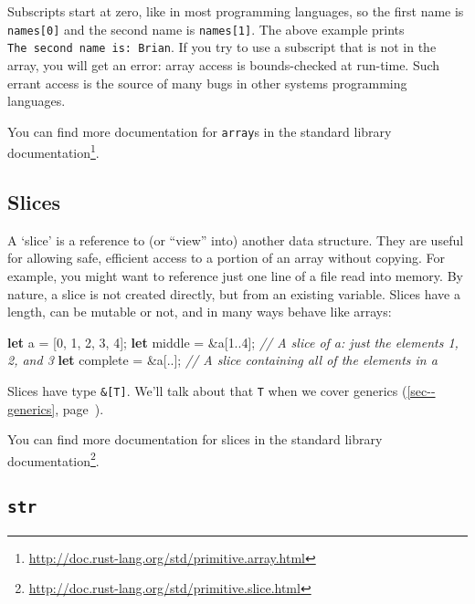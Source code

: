 \documentclass[a4paper,]{book}
\renewcommand*{\hyperref}[2][\ar]{%
  \def\ar{#2}%
  #2 (\autoref{#1}, page~\pageref{#1})}
\newenvironment{Shaded}{\begin{snugshade}}{\end{snugshade}}
\newcommand{\KeywordTok}[1]{\textcolor[rgb]{0.13,0.29,0.53}{\textbf{{#1}}}}
\newcommand{\DecValTok}[1]{\textcolor[rgb]{0.00,0.00,0.81}{{#1}}}
\newcommand{\CommentTok}[1]{\textcolor[rgb]{0.56,0.35,0.01}{\textit{{#1}}}}
\newcommand{\NormalTok}[1]{{#1}}
\renewcommand{\href}[2]{#2\footnote{\url{#1}}}
\begin{document}
Subscripts start at zero, like in most programming languages, so the
first name is \texttt{names{[}0{]}} and the second name is
\texttt{names{[}1{]}}. The above example prints
\texttt{The\ second\ name\ is:\ Brian}. If you try to use a subscript
that is not in the array, you will get an error: array access is
bounds-checked at run-time. Such errant access is the source of many
bugs in other systems programming languages.

You can find more documentation for \texttt{array}s
\href{http://doc.rust-lang.org/std/primitive.array.html}{in the standard
library documentation}.

\subsection{Slices}\label{slices}

A `slice' is a reference to (or ``view'' into) another data structure.
They are useful for allowing safe, efficient access to a portion of an
array without copying. For example, you might want to reference just one
line of a file read into memory. By nature, a slice is not created
directly, but from an existing variable. Slices have a length, can be
mutable or not, and in many ways behave like arrays:

\begin{Shaded}
\begin{Highlighting}[]
\KeywordTok{let} \NormalTok{a = [}\DecValTok{0}\NormalTok{, }\DecValTok{1}\NormalTok{, }\DecValTok{2}\NormalTok{, }\DecValTok{3}\NormalTok{, }\DecValTok{4}\NormalTok{];}
\KeywordTok{let} \NormalTok{middle = &a[}\DecValTok{1.}\NormalTok{.}\DecValTok{4}\NormalTok{]; }\CommentTok{// A slice of a: just the elements 1, 2, and 3}
\KeywordTok{let} \NormalTok{complete = &a[..]; }\CommentTok{// A slice containing all of the elements in a}
\end{Highlighting}
\end{Shaded}

Slices have type \texttt{\&{[}T{]}}. We'll talk about that \texttt{T}
when we cover \hyperref[sec--generics]{generics}.

You can find more documentation for slices
\href{http://doc.rust-lang.org/std/primitive.slice.html}{in the standard
library documentation}.

\subsection{\texorpdfstring{\texttt{str}}{str}}\label{str}
\end{document}
